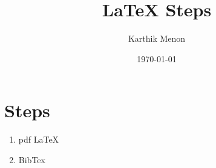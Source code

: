 \documentclass[a4paper,12pt]{article}
\begin{document}
\title{LaTeX Steps}
\author{Karthik Menon}
\date{\today}
\maketitle
\newpage
\newpage
\section{Steps}
	\begin{enumerate}
		\item pdf LaTeX
		\item BibTex
	\end{enumerate}
\end{document}
